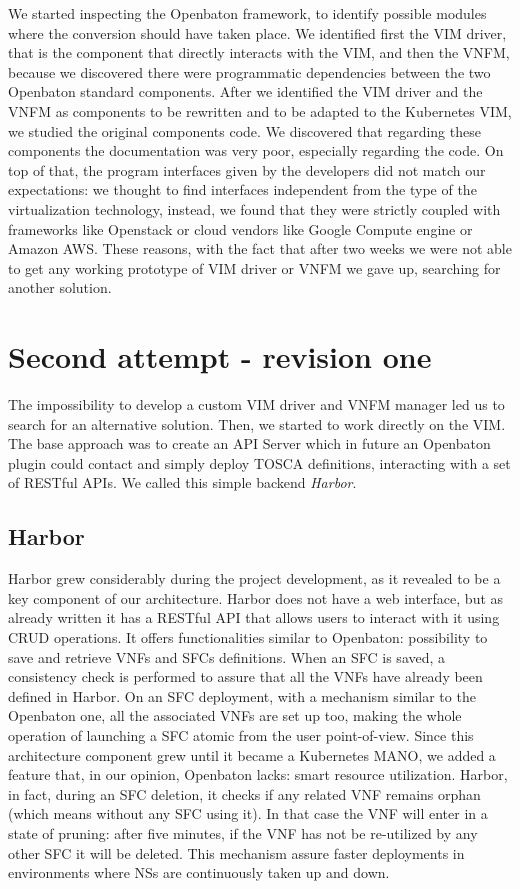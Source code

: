 We started inspecting the Openbaton framework, to identify possible modules
where the conversion should have taken place. We identified first the VIM
driver, that is the component that directly interacts with the VIM, and then the
VNFM, because we discovered there were programmatic dependencies between the two
Openbaton standard components. After we identified the VIM driver and the VNFM
as components to be rewritten and to be adapted to the Kubernetes VIM, we
studied the original components code. We discovered that regarding these
components the documentation was very poor, especially regarding the code. On
top of that, the program interfaces given by the developers did not match our
expectations: we thought to find interfaces independent from the type of the
virtualization technology, instead, we found that they were strictly coupled
with frameworks like Openstack or cloud vendors like Google Compute engine or
Amazon AWS. These reasons, with the fact that after two weeks we were not able
to get any working prototype of VIM driver or VNFM we gave up, searching for
another solution.

\section{Second attempt - revision one}

The impossibility to develop a custom VIM driver and VNFM manager led us to
search for an alternative solution. Then, we started to work directly on the
VIM. The base approach was to create an API Server which in future an Openbaton
plugin could contact and simply deploy TOSCA definitions, interacting with a set
of RESTful APIs. We called this simple backend \emph{Harbor}.

\subsection{Harbor}
\label{chap:archimpl:sec:secondattempt:sub:harbor}
Harbor grew considerably during the project development, as it revealed to be a
key component of our architecture. Harbor does not have a web interface, but as
already written it has a RESTful API that allows users to interact with it using
CRUD operations. It offers functionalities similar to Openbaton: possibility to
save and retrieve VNFs and SFCs definitions. When an SFC is saved, a consistency
check is performed to assure that all the VNFs have already been defined in
Harbor. On an SFC deployment, with a mechanism similar to the Openbaton one, all
the associated VNFs are set up too, making the whole operation of launching a
SFC atomic from the user point-of-view. Since this architecture component grew
until it became a Kubernetes MANO, we added a feature that, in our opinion,
Openbaton lacks: smart resource utilization. Harbor, in fact, during an SFC
deletion, it checks if any related VNF remains orphan (which means without any
SFC using it). In that case the VNF will enter in a state of pruning: after five
minutes, if the VNF has not be re-utilized by any other SFC it will be deleted.
This mechanism assure faster deployments in environments where NSs are
continuously taken up and down.

